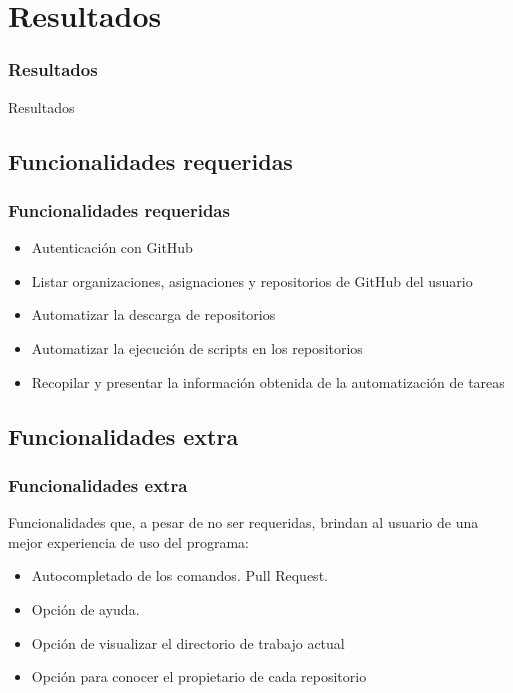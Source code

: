 \documentclass{beamer}
\begin{document}

\section{Resultados}
\begin{frame}
\frametitle{Resultados}
  
  \begin{center}
    \Huge{Resultados}
  \end{center}
\end{frame}

\subsection{Funcionalidades requeridas}
\begin{frame}
\frametitle{Funcionalidades requeridas}
  \bigskip
  \bigskip
  
  \begin{itemize}
    \item Autenticación con GitHub
    \item Listar organizaciones, asignaciones y repositorios de GitHub del usuario
    \item Automatizar la descarga de repositorios
    \item Automatizar la ejecución de scripts en los repositorios
    \item Recopilar y presentar la información obtenida de la automatización de tareas
  \end{itemize}
  
  
\end{frame}
  
\subsection{Funcionalidades extra}
  
\begin{frame}[allowframebreaks]
\frametitle{Funcionalidades extra}
  Funcionalidades que, a pesar de no ser requeridas, brindan al usuario de una mejor experiencia de uso del programa:
  \bigskip
  
  \begin{itemize}
    \item Autocompletado de los comandos.
    Pull Request.
    \item Opción de ayuda.
    \item Opción de visualizar el directorio de trabajo actual
    \item Opción para conocer el propietario de cada repositorio
    \framebreak
    
  \end{itemize}  
\end{frame}
\end{document}
